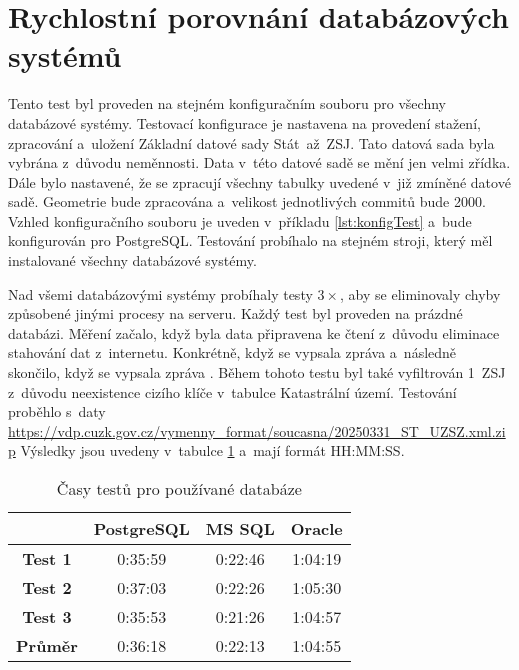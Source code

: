\section{Rychlostní porovnání databázových systémů}
Tento test byl proveden na stejném konfiguračním souboru pro všechny databázové systémy.
Testovací konfigurace je nastavena na provedení stažení, zpracování a~uložení Základní datové sady Stát~až~ZSJ.
Tato datová sada byla vybrána z~důvodu neměnnosti.
Data v~této datové sadě se mění jen velmi zřídka.
Dále bylo nastavené, že se zpracují všechny tabulky uvedené v~již zmíněné datové sadě.
Geometrie bude zpracována a~velikost jednotlivých commitů bude 2000.
Vzhled konfiguračního souboru je uveden v~příkladu \ref{lst:konfigTest} a~bude konfigurován pro PostgreSQL.
Testování probíhalo na stejném stroji, který měl instalované všechny databázové systémy.

Nad všemi databázovými systémy probíhaly testy \(3\times\), aby se eliminovaly chyby způsobené jinými procesy na serveru.
Každý test byl proveden na prázdné databázi.
Měření začalo, když byla data připravena ke čtení z~důvodu eliminace stahování dat z~internetu.
Konkrétně, když se vypsala zpráva  a~následně skončilo, když se
vypsala zpráva .
Během tohoto testu byl také vyfiltrován 1~ZSJ z~důvodu neexistence cizího klíče v~tabulce Katastrální území.
Testování proběhlo s~daty \url{https://vdp.cuzk.gov.cz/vymenny_format/soucasna/20250331_ST_UZSZ.xml.zip}
Výsledky jsou uvedeny v~tabulce \ref{tab:test1} a~mají formát HH:MM:SS.

\begin{table}[!h]
  \centering
  \caption{Časy testů pro používané databáze}
  \label{tab:test1}
  \begin{tabular}{|c|c|c|c|}
  \hline
                  & \textbf{PostgreSQL} & \textbf{MS SQL} & \textbf{Oracle} \\ \hline
  \textbf{Test 1} & 0:35:59             & 0:22:46         & 1:04:19         \\ \hline
  \textbf{Test 2} & 0:37:03             & 0:22:26         & 1:05:30         \\ \hline
  \textbf{Test 3} & 0:35:53             & 0:21:26         & 1:04:57         \\ \hline
  \textbf{Průměr} & 0:36:18             & 0:22:13         & 1:04:55         \\ \hline
  \end{tabular}
\end{table}

